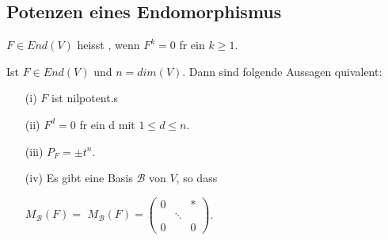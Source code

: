 \documentclass[11pt, a4paper]{article}
\begin{document}
\subsection{Potenzen eines Endomorphismus}
\begin{definition}
$F \in End(V)$ heisst , wenn $F^k = 0$ f\uee r ein $k \geq 1$.
\end{definition}
\begin{theorem}
Ist $F \in End(V)$ und $n = dim(V)$. Dann sind folgende Aussagen \aee quivalent:
\begin{itemize}
\item[(i)] $F$ ist nilpotent.s
\item[(ii)] $F^d = 0$ f\uee r ein d mit $1 \leq d \leq n$.
\item[(iii)] $P_F = \pm t^n$.
\item[(iv)] Es gibt eine Basis $\mathcal{B}$ von $V$, so dass 
\\ \centerline{$M_\mathcal{B} (F) = $
$M_{\mathcal{B}}(F)=\left(\begin{array}{ccc}
{0} & {} & {*} \\ {} & {\ddots} & {} 
\\ {0} & {} & {0}\end{array}\right)$.
}
\end{itemize}
\end{theorem}
\end{document}
